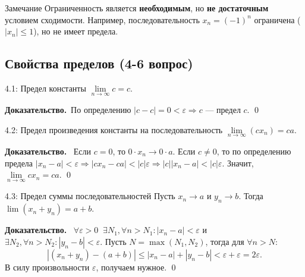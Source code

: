 \documentclass[a4paper,12pt]{article}
\newcommand{\myproof}{\textbf{Доказательство.}\ }
\begin{document}
	
	\vspace{0.5cm}
	\begin{importantbox}{Замечание}
	Ограниченность является \textbf{необходимым}, но \textbf{не достаточным} условием сходимости. 
	Например, последовательность $x_n = (-1)^n$ ограничена ($|x_n| \le 1$), но не имеет предела.
	\end{importantbox}
	
	
	
	
	
	
	
	\vspace{1cm}
	\subsection{Свойства пределов (4-6 вопрос)}
	
	\begin{theorembox}{4.1: Предел константы}
		$\lim\limits_{n \to \infty} c = c$.
	\end{theorembox}
	\myproof По определению $|c - c| = 0 < \varepsilon \Rightarrow c \text{ — предел } c$. \qed
	
	\begin{theorembox}{4.2: Предел произведения константы на последовательность}
		$\lim\limits_{n \to \infty} (c x_n) = ca$.
	\end{theorembox}
	\myproof
	Если $c = 0$, то $0 \cdot x_n \to 0 \cdot a$.
	Если $c \neq 0$, то по определению предела $|x_n - a| < \varepsilon \Rightarrow |c x_n - ca| < |c|\varepsilon \Rightarrow |c||x_n - a| < |c|\varepsilon$. Значит, $\lim\limits_{n \to \infty} c x_n = ca$. \qed
	
	\begin{theorembox}{4.3: Предел суммы последовательностей}
		Пусть $x_n \to a$ и $y_n \to b$. Тогда $\lim (x_n + y_n) = a + b$.
	\end{theorembox}
	\myproof
	$\forall \varepsilon > 0 \;\; \exists N_1, \forall n > N_1 \colon |x_n - a| < \varepsilon$ и $\exists N_2, \forall n > N_2 \colon |y_n - b| < \varepsilon$.
	Пусть $N = \max(N_1, N_2)$, тогда для $\forall n > N$:
	\[ |(x_n + y_n) - (a + b)| \le |x_n - a| + |y_n - b| < \varepsilon + \varepsilon = 2\varepsilon \text{.} \]
	В силу произвольности $\varepsilon$, получаем нужное. \qed
	
	\begin{center}
	\end{center}
	
\end{document}
